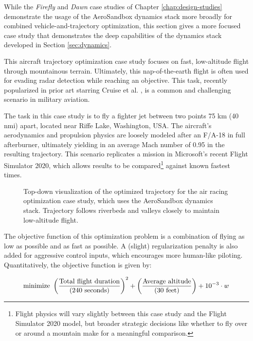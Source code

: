 While the \emph{Firefly} and \emph{Dawn} case studies of Chapter \ref{chap:design-studies} demonstrate the usage of the AeroSandbox dynamics stack more broadly for combined vehicle-and-trajectory optimization, this section gives a more focused case study that demonstrates the deep capabilities of the dynamics stack developed in Section \ref{sec:dynamics}.

This aircraft trajectory optimization case study focuses on fast, low-altitude flight through mountainous terrain. Ultimately, this nap-of-the-earth flight is often used for evading radar detection while reaching an objective. This task, recently popularized in prior art starring Cruise et al. \cite{topgunmaverick2022}, is a common and challenging scenario in military aviation.

The task in this case study is to fly a fighter jet between two points 75 km (40 nmi) apart, located near Riffe Lake, Washington, USA. The aircraft's aerodynamics and propulsion physics are loosely modeled after an F/A-18 in full afterburner, ultimately yielding in an average Mach number of 0.95 in the resulting trajectory. This scenario replicates a mission in Microsoft's recent Flight Simulator 2020, which allows results to be compared\footnote{Flight physics will vary slightly between this case study and the Flight Simulator 2020 model, but broader strategic decisions like whether to fly over or around a mountain make for a meaningful comparison.} against known fastest times.

\begin{figure}[H]
    \centering
    
    \caption{Top-down visualization of the optimized trajectory for the air racing optimization case study, which uses the AeroSandbox dynamics stack. Trajectory follows riverbeds and valleys closely to maintain low-altitude flight.}
    \label{fig:air-racing-trajectory}
\end{figure}

The objective function of this optimization problem is a combination of flying as low as possible and as fast as possible. A (slight) regularization penalty is also added for aggressive control inputs, which encourages more human-like piloting. Quantitatively, the objective function is given by:

\begin{equation}
    \text{minimize }
    \left(
    \frac
    {\text{Total flight duration}}
    {({240\ \rm seconds})}
    \right)^2 +
    \left(
    \frac
    {\text{Average altitude}}
    {({30\ \rm feet})}
    \right) +
    10^{-3} \cdot w
\end{equation}

